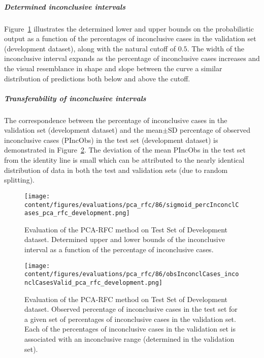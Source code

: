 \subparagraph{Determined inconclusive intervals}

Figure~\ref{fig:pca_rfc_percInconclCases_development} illustrates the determined lower and upper bounds on the 
probabilistic output as a function of the percentages of inconclusive cases in the validation set (development dataset), 
along with the natural cutoff of $0.5$.
The width of the inconclusive interval expands as the percentage of inconclusive cases increases 
and the visual resemblance in shape and slope between the curve a similar distribution of predictions both below and above the cutoff.

\subparagraph{Transferability of inconclusive intervals}

The correspondence between the percentage of inconclusive cases in the validation set (development dataset) and 
the mean$\pm$SD percentage of observed inconclusive cases (PIncObs) in the test set (development dataset) 
is demonstrated in Figure~\ref{fig:obsInconclCases_inconclCasesValid_pca_rfc_development}.
The deviation of the mean PIncObs in the test set from the 
identity line is small which can be attributed to the nearly identical distribution of data in both the test and validation sets 
(due to random splitting).


\begin{figure}[ht]
  \centering
  \texttt{[image: content/figures/evaluations/pca\_rfc/86/sigmoid\_percInconclCases\_pca\_rfc\_development.png]}
  \caption{Evaluation of the PCA-RFC method on Test Set of Development dataset. 
  Determined upper and lower bounds of the inconclusive interval as a function of the percentage of inconclusive cases.} 
  \label{fig:pca_rfc_percInconclCases_development}
\end{figure}


\begin{figure}[ht]
  \centering
  \texttt{[image: content/figures/evaluations/pca\_rfc/86/obsInconclCases\_inconclCasesValid\_pca\_rfc\_development.png]}
  \caption{Evaluation of the PCA-RFC method on Test Set of Development dataset.
  Observed percentage of inconclusive cases in the test set 
  for a given set of percentages of inconclusive cases in the validation set.
  Each of the percentages of inconclusive cases in the validation set is associated 
  with an inconclusive range (determined in the validation set).} 
  \label{fig:obsInconclCases_inconclCasesValid_pca_rfc_development}
\end{figure} 


